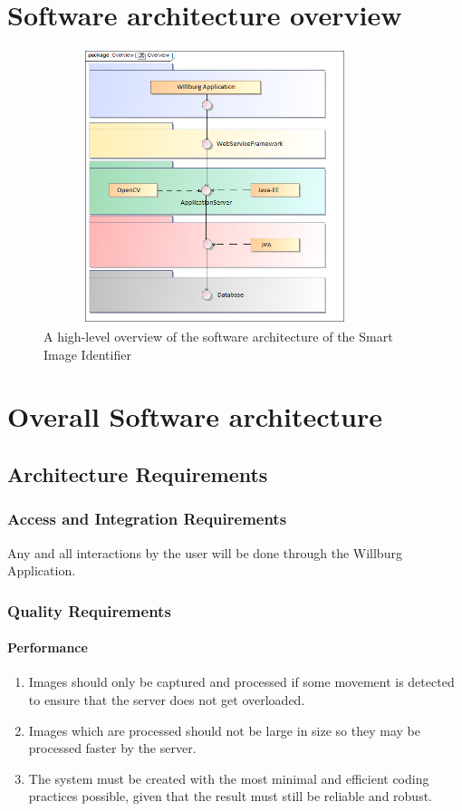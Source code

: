 \documentclass[a4paper,12pt]{report}
\begin{document}
\section {Software architecture overview}

	\begin{figure}[htb]
		\centering
		\includegraphics [height= 8cm, width=10cm]{../Diagrams/SystemOverview.png}
		\caption{A high-level overview of the software architecture of the Smart Image Identifier}
	\end{figure}


\section {Overall Software architecture}	
\subsection{Architecture Requirements}
\subsubsection{Access and Integration Requirements}
Any and all interactions by the user will be done through the Willburg Application.
\subsubsection{Quality Requirements}
\paragraph{Performance}
\begin{enumerate}
	\item Images should only be captured and processed if some movement is detected to ensure that the server does not get overloaded.
	\item Images which are processed should not be large in size so they may be processed faster by the server.
	\item The system must be created with the most minimal and efficient coding
	practices possible, given that the result must still be reliable and robust.
\end{enumerate}
\end{document}
